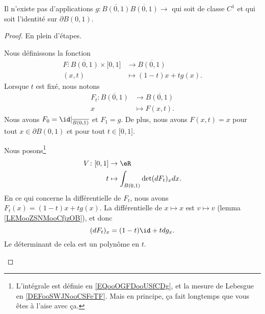 \begin{proposition}	\label{PROPooBRZCooLvscEf}
	Il n'existe pas d'applications \(g \colon \overline{B(0,1)}\overline{B(0,1)}\to   \) qui soit de classe \( C^1\) et qui soit l'identité sur \( \partial B(0,1)\).
\end{proposition}

\begin{proof}
	En plein d'étapes.
	\begin{subproof}
		Nous définissons la fonction
		\begin{equation}
			\begin{aligned}
				F\colon \overline{B(0,1)}\times\mathopen[ 0,1\mathclose] & \to  \overline{B(0,1)} \\
				(x,t)                                                    & \mapsto (1-t)x+tg(x).
			\end{aligned}
		\end{equation}
		Lorsque \( t\) est fixé, nous notons
		\begin{equation}
			\begin{aligned}
				F_t\colon \overline{B(0,1)} & \to \overline{B(0,1)} \\
				x                           & \mapsto F(x,t).
			\end{aligned}
		\end{equation}
		Nous avons \( F_0=\id|_{\overline{B(0,1)}} \) et \( F_1=g\). De plus, nous avons \( F(x,t)=x\) pour tout \( x\in\partial B(0,1)\) et pour tout \( t\in\mathopen[ 0,1\mathclose]\).

		\spitem[définition de \( V\)]
		Nous posons\footnote{L'intégrale est définie en \eqref{EQooOGFDooUSfCDg}, et la mesure de Lebesgue en \ref{DEFooSWJNooCSFeTF}. Mais en principe, ça fait longtemps que vous êtes à l'aise avec ça.}
		\begin{equation}
			\begin{aligned}
				V\colon \mathopen[ 0,1\mathclose] & \to \eR                              \\
				t                                 & \mapsto \int_{B(0,1)}\det(dF_t)_xdx.
			\end{aligned}
		\end{equation}
		En ce qui concerne la différentielle de \( F_t\), nous avons \( F_t(x)=(1-t)x+tg(x)\). La différentielle de \( x\mapsto x\) est \( v\mapsto v\) (lemma \ref{LEMooZSNMooCfjzOB}), et donc
		\begin{equation}
			(dF_t)_x=(1-t)\id+tdg_x.
		\end{equation}
		Le déterminant de cela est un polynôme en \( t\).


\end{subproof}
\end{proof}
